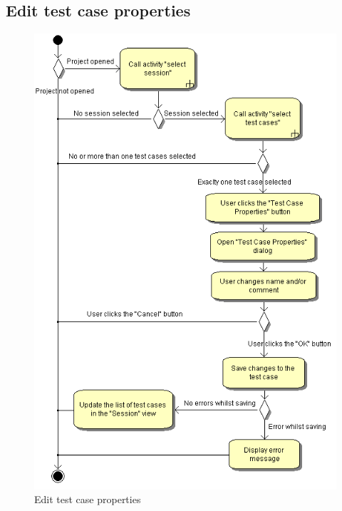\subsection{Edit test case properties}
\begin{figure}[htb]
 \centering
 \includegraphics[height=0.7\textheight]{images/Activities/edit_test_case_properties.png}
 \caption{Edit test case properties}
 \label{ac_fg:edit_test_case}
\end{figure}

\clearpage
